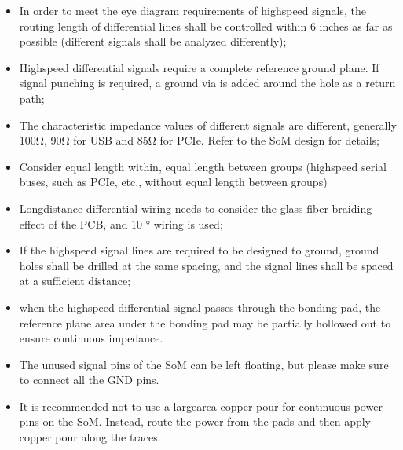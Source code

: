 \documentclass[letterpaper,10pt,openany,english]{sphinxmanual}
\begin{document}
\sphinxAtStartPar
{}
\begin{itemize}
\item {} 
\sphinxAtStartPar
In order to meet the eye diagram requirements of high\sphinxhyphen{}speed signals, the routing length of differential lines shall be controlled within 6 inches as far as possible (different signals shall be analyzed differently);

\item {} 
\sphinxAtStartPar
High\sphinxhyphen{}speed differential signals require a complete reference ground plane. If signal punching is required, a ground via is added around the hole as a return path;

\item {} 
\sphinxAtStartPar
The characteristic impedance values of different signals are different, generally 100Ω, 90Ω for USB and 85Ω for PCIe. Refer to the SoM design for details;

\item {} 
\sphinxAtStartPar
Consider equal length within, equal length between groups (high\sphinxhyphen{}speed serial buses, such as PCIe, etc., without equal length between groups)

\item {} 
\sphinxAtStartPar
Long\sphinxhyphen{}distance differential wiring needs to consider the glass fiber braiding effect of the PCB, and 10 ° wiring is used;

\item {} 
\sphinxAtStartPar
If the high\sphinxhyphen{}speed signal lines are required to be designed to ground, ground holes shall be drilled at the same spacing, and the signal lines shall be spaced at a sufficient distance;

\item {} 
\sphinxAtStartPar
when the high\sphinxhyphen{}speed differential signal passes through the bonding pad, the reference plane area under the bonding pad may be partially hollowed out to ensure continuous impedance.

\end{itemize}

\sphinxAtStartPar
{}
\begin{itemize}
\item {} 
\sphinxAtStartPar
The unused signal pins of the SoM can be left floating, but please make sure to connect all the GND pins.

\item {} 
\sphinxAtStartPar
It is recommended not to use a large\sphinxhyphen{}area copper pour for continuous power pins on the SoM. Instead, route the power from the pads and then apply copper pour along the traces.

\end{itemize}
\end{document}
